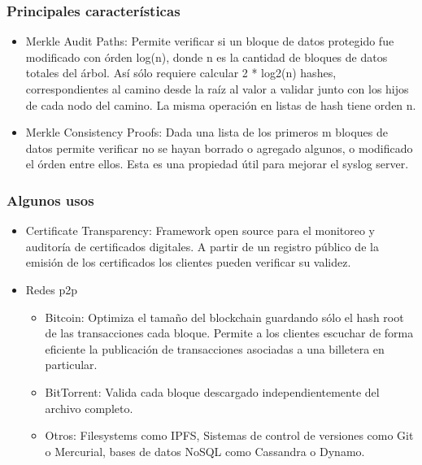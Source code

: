 \documentclass[10pt, a4paper,english,spanish]{beamer}
\begin{document}
\begin{frame}
\frametitle{Principales caracter\'isticas}

\begin{itemize}

\item Merkle Audit Paths: Permite verificar si un bloque de datos protegido fue modificado con \'orden log(n), donde n es la cantidad de bloques de datos totales del \'arbol. As\'i s\'olo requiere calcular 2 * log2(n) hashes, correspondientes al camino desde la ra\'iz al valor a validar junto con los hijos de cada nodo del camino. La misma operaci\'on en listas de hash tiene orden n.

\item Merkle Consistency Proofs: Dada una lista de los primeros m bloques de datos permite verificar no se hayan borrado o agregado algunos, o modificado el \'orden entre ellos. Esta es una propiedad \'util para mejorar el syslog server.

\end{itemize}

\end{frame}




\begin{frame}
\frametitle{Algunos usos}

\begin{itemize}

\item Certificate Transparency: Framework open source para el monitoreo y auditor\'ia de certificados digitales. A partir de un registro p\'ublico de la emisi\'on de los certificados los clientes pueden verificar su validez.

\item Redes p2p
\begin{itemize}

\item Bitcoin: Optimiza el tama\~no del blockchain guardando s\'olo el hash root de las transacciones cada bloque. Permite a los clientes escuchar de forma eficiente la publicaci\'on de transacciones asociadas a una billetera en particular.
\item BitTorrent: Valida cada bloque descargado independientemente del archivo completo.
\item Otros: Filesystems como IPFS, Sistemas de control de versiones como Git o Mercurial, bases de datos NoSQL como Cassandra o Dynamo.

\end{itemize}

\end{itemize}

\end{frame}
\end{document}
